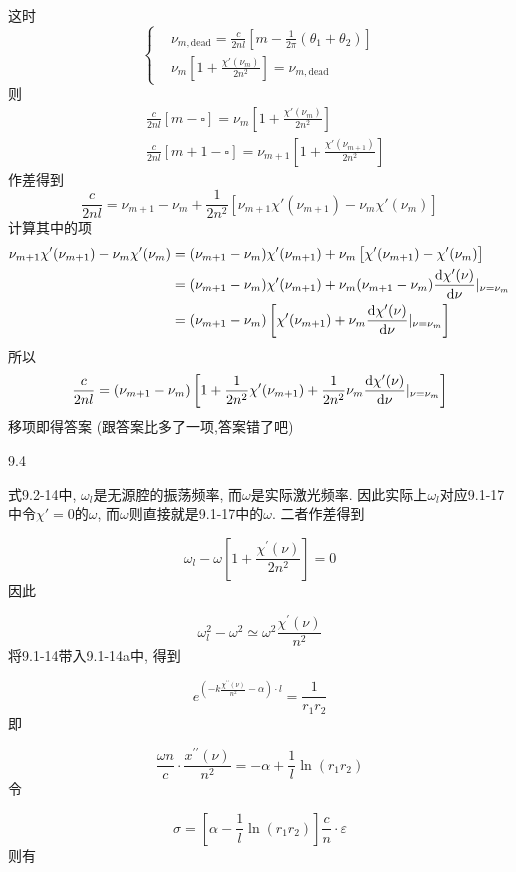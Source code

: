 这时
$$
\left\{
\begin{aligned}
    &\nu_{m,\mathrm{dead}}=\frac{c}{2nl}\left[m-\frac{1}{2\pi}(\theta_1+\theta_2)\right]\\
    &\nu_{m}\left[1+\frac{\chi'(\nu_m)}{2n^2}\right]=\nu_{m,\mathrm{dead}}    
\end{aligned}
\right.
$$
则
\begin{align*}
    &\frac{c}{2nl}\left[m-\square\right]=\nu_{m}\left[1+\frac{\chi'(\nu_m)}{2n^2}\right]\\
    &\frac{c}{2nl}\left[m+1-\square\right]=\nu_{m+1}\left[1+\frac{\chi'(\nu_{m+1})}{2n^2}\right]
\end{align*}
作差得到
$$
\frac{c}{2nl}=\nu_{m+1}-\nu_m+\frac{1}{2n^2}\left[\nu_{m+1}\chi'(\nu_{m+1})-\nu_{m}\chi'(\nu_{m})\right]
$$
计算其中的项
\begin{align*}
    \nu_{m+1}\chi'(\nu_{m+1})-\nu_{m}\chi'(\nu_{m})
    &=(\nu_{m+1}-\nu_{m})\chi'(\nu_{m+1})+\nu_{m}\left[\chi'(\nu_{m+1})-\chi'(\nu_{m})\right]\\
    &=(\nu_{m+1}-\nu_{m})\chi'(\nu_{m+1})+\nu_{m}(\nu_{m+1}-\nu_{m})\frac{\dif \chi'(\nu)}{\dif \nu}|_{\nu=\nu_m}\\
    &=(\nu_{m+1}-\nu_{m})\left[\chi'(\nu_{m+1})+\nu_{m}\frac{\dif \chi'(\nu)}{\dif \nu}|_{\nu=\nu_m}\right]
\end{align*}
所以
$$
\frac{c}{2nl}=(\nu_{m+1}-\nu_{m})\left[1+\frac{1}{2n^2}\chi'(\nu_{m+1})+\frac{1}{2n^2}\nu_{m}\frac{\dif \chi'(\nu)}{\dif \nu}|_{\nu=\nu_m}\right]
$$
移项即得答案 (跟答案比多了一项,答案错了吧)

9.4

式9.2-14中, \(\omega_l\)是无源腔的振荡频率, 而\(\omega\)是实际激光频率. 因此实际上\(\omega_l\)对应9.1-17中令\(\chi'=0\)的\(\omega\), 而\(\omega\)则直接就是9.1-17中的\(\omega\). 二者作差得到

\[\omega_{l}-\omega\left[1+\frac{\chi^{\prime}(\nu)}{2 n^{2}}\right]=0 \]
因此

\[\omega_{l}^{2}-\omega^{2} \simeq \omega^{2} \frac{\chi^{\prime}(\nu)}{n^{2}}\tag{$*$} \]
将9.1-14带入9.1-14a中, 得到

\[e^{\left(- k \frac{\chi^{\prime \prime}(\nu)}{n^{2}}-\alpha\right) \cdot l}=\frac{1}{r_{1} r_{2}} \]
即

\[\frac{\omega n}{c} \cdot \frac{x^{\prime \prime}(\nu)}{n^{2}}=-\alpha+\frac{1}{l}\ln(r_1r_2) \]
令

\[\sigma=\left[\alpha-\frac{1}{l} \ln \left(r_{1} r_{2}\right)\right] \frac{c}{n} \cdot \varepsilon \]
则有


